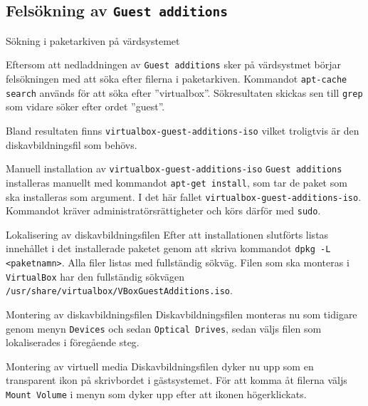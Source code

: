 \subsection{Felsökning av \texttt{Guest additions}}

           {Sökning i paketarkiven på värdsystemet}
           {Eftersom att nedladdningen av \texttt{Guest additions} sker på
            värdsystmet börjar felsökningen med att söka efter filerna i
            paketarkiven. Kommandot \texttt{apt-cache search} används för att
            söka efter ''virtualbox''. Sökresultaten skickas sen till
            \texttt{grep} som vidare söker efter ordet ''guest''.
            \par Bland resultaten finns \texttt{virtualbox-guest-additions-iso}
            vilket troligtvis är den diskavbildningsfil som behövs.}
           {}

           {Manuell installation av \texttt{virtualbox-guest-additions-iso}}
           {\texttt{Guest additions} installeras manuellt med kommandot
            \texttt{apt-get install}, som tar de paket som ska installeras som
            argument. I det här fallet \texttt{virtualbox-guest-additions-iso}.
            Kommandot kräver administratörsrättigheter och körs därför med
            \texttt{sudo}.}
           {}

           {Lokalisering av diskavbildningsfilen}
           {Efter att installationen slutförts listas innehållet i det
            installerade paketet genom att skriva kommandot 
            \texttt{dpkg -L <paketnamn>}.  Alla filer listas med fullständig
            sökväg. Filen som ska monteras i \texttt{VirtualBox} har den
            fullständig sökvägen
            \texttt{/usr/share/virtualbox/VBoxGuestAdditions.iso}.}
           {}

           {Montering av diskavbildningsfilen}
           {Diskavbildningsfilen monteras nu som tidigare genom menyn
            \texttt{Devices} och sedan \texttt{Optical Drives}, sedan väljs
            filen som lokaliserades i föregående steg.}
           {}

           {Montering av virtuell media}
           {Diskavbildningsfilen dyker nu upp som en transparent ikon på
            skrivbordet i gästsystemet. För att komma åt filerna väljs
            \texttt{Mount Volume} i menyn som dyker upp efter att ikonen
            högerklickats.}
           {}


